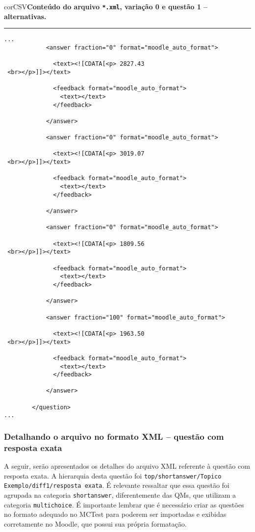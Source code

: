 \begin{myboxCode}{corCSV}{\textbf{Conteúdo do arquivo \texttt{*.xml}, variação 0 e questão 1 -- alternativas.}}\vspace{3mm}
\hrule
{\scriptsize
\begin{verbatim}
...
            <answer fraction="0" format="moodle_auto_format">
            
              <text><![CDATA[<p> 2827.43
 <br></p>]]></text>
            
              <feedback format="moodle_auto_format">
                <text></text>
              </feedback>
              
            </answer>
        
            <answer fraction="0" format="moodle_auto_format">
            
              <text><![CDATA[<p> 3019.07
 <br></p>]]></text>
 
              <feedback format="moodle_auto_format">
                <text></text>
              </feedback>
              
            </answer>
        
            <answer fraction="0" format="moodle_auto_format">
            
              <text><![CDATA[<p> 1809.56
 <br></p>]]></text>
 
              <feedback format="moodle_auto_format">
                <text></text>
              </feedback>
              
            </answer>
        
            <answer fraction="100" format="moodle_auto_format">
            
              <text><![CDATA[<p> 1963.50
 <br></p>]]></text>
 
              <feedback format="moodle_auto_format">
                <text></text>
              </feedback>
              
            </answer>
        
        </question>     
...
\end{verbatim}
}
\end{myboxCode}

\subsubsection{Detalhando o arquivo no formato XML -- questão com resposta exata}

A seguir, serão apresentados os detalhes do arquivo XML referente à questão com resposta exata. A hierarquia desta questão foi \verb|top/shortanswer/Topico Exemplo/diff1/resposta exata|. É relevante ressaltar que essa questão foi agrupada na categoria \verb|shortanswer|, diferentemente das QMs, que utilizam a categoria \verb|multichoice|. É importante lembrar que é necessário criar as questões no formato adequado no MCTest para poderem ser importadas e exibidas corretamente no Moodle, que possui sua própria formatação.

